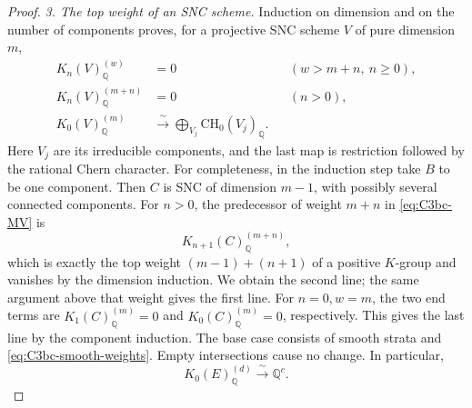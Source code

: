 \begin{proof}
\emph{3. The top weight of an SNC scheme.}
Induction on dimension and on the number of components proves,
for a projective SNC scheme \(V\) of pure dimension \(m\),
\begin{equation}\label{eq:C3bc-SNC-weights}
 \begin{aligned}
 K_n(V)_{\mathbb Q}^{(w)}&=0
                 &&(w>m+n,\ n\geq0),\\
 K_n(V)_{\mathbb Q}^{(m+n)}&=0
                 &&(n>0),\\
 K_0(V)_{\mathbb Q}^{(m)}
       &\xrightarrow{\ \sim\ }
           \bigoplus_{V_j}\mathrm{CH}_0(V_j)_{\mathbb Q}.
 \end{aligned}
\end{equation}
Here \(V_j\) are its irreducible components, and the last map is
restriction followed by the rational Chern character.
For completeness, in the induction step take \(B\) to be one
component. Then \(C\) is SNC of dimension \(m-1\), with possibly
several connected components. For \(n>0\), the predecessor of
weight \(m+n\) in \eqref{eq:C3bc-MV} is
\[
                  K_{n+1}(C)_{\mathbb Q}^{(m+n)},
\]
which is exactly the top weight
\((m-1)+(n+1)\) of a positive \(K\)-group and vanishes by the
dimension induction. We obtain the second line; the same argument
above that weight gives the first line. For \(n=0,w=m\), the two
end terms are \(K_1(C)_{\mathbb Q}^{(m)}=0\) and
\(K_0(C)_{\mathbb Q}^{(m)}=0\), respectively. This gives the last
line by the component induction. The base case consists of smooth
strata and \eqref{eq:C3bc-smooth-weights}. Empty intersections
cause no change.
In particular,
\begin{equation}\label{eq:C3bc-E-degrees}
             K_0(E)_{\mathbb Q}^{(d)}
                      \xrightarrow{\ \sim\ }\mathbb Q^c.
\end{equation}


\end{proof}
